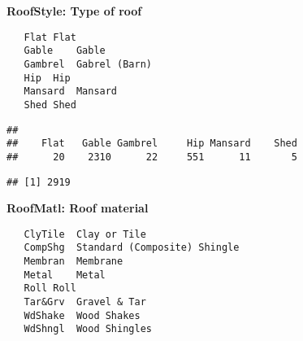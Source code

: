 \documentclass[]{article}
\newenvironment{Shaded}{\begin{snugshade}}{\end{snugshade}}
\newcommand{\CommentTok}[1]{\textcolor[rgb]{0.56,0.35,0.01}{\textit{#1}}}
\newcommand{\KeywordTok}[1]{\textcolor[rgb]{0.13,0.29,0.53}{\textbf{#1}}}
\newcommand{\NormalTok}[1]{#1}
\newcommand{\OperatorTok}[1]{\textcolor[rgb]{0.81,0.36,0.00}{\textbf{#1}}}
\newcommand{\StringTok}[1]{\textcolor[rgb]{0.31,0.60,0.02}{#1}}
\begin{document}
\textbf{RoofStyle: Type of roof}

\begin{verbatim}
   Flat Flat
   Gable    Gable
   Gambrel  Gabrel (Barn)
   Hip  Hip
   Mansard  Mansard
   Shed Shed
\end{verbatim}

\begin{Shaded}
\end{Shaded}

\begin{verbatim}
## 
##    Flat   Gable Gambrel     Hip Mansard    Shed 
##      20    2310      22     551      11       5
\end{verbatim}

\begin{Shaded}
\end{Shaded}

\begin{verbatim}
## [1] 2919
\end{verbatim}

\textbf{RoofMatl: Roof material}

\begin{verbatim}
   ClyTile  Clay or Tile
   CompShg  Standard (Composite) Shingle
   Membran  Membrane
   Metal    Metal
   Roll Roll
   Tar&Grv  Gravel & Tar
   WdShake  Wood Shakes
   WdShngl  Wood Shingles
\end{verbatim}

\begin{Shaded}
\end{Shaded}
\end{document}
